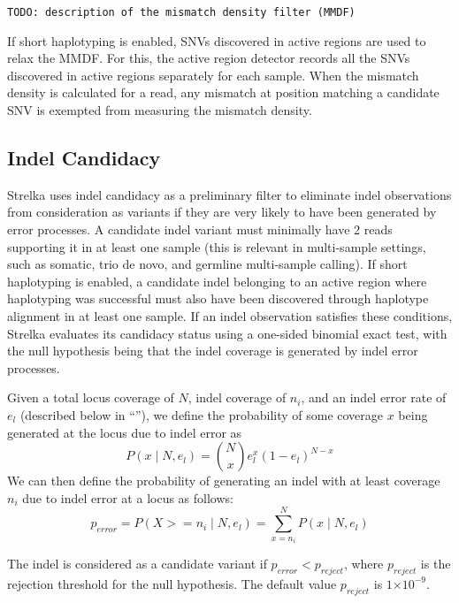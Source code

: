 \documentclass{article}
\newcommand{\e}[1]{\ensuremath{\times 10^{#1}}}
\begin{document}
{\tt TODO: description of the mismatch density filter (MMDF)}

If short haplotyping is enabled, SNVs discovered in active regions are used to relax the MMDF. For this, the active region detector records all the SNVs discovered in active regions separately for each sample. When the mismatch density is calculated for a read, any mismatch at position matching a candidate SNV is exempted from measuring the mismatch density.


\subsection{Indel Candidacy}
\label{sec:IndelCandidacy}

Strelka uses indel candidacy as a preliminary filter to eliminate indel observations from consideration as variants if they are very likely to have been generated by error processes.  A candidate indel variant must minimally have 2 reads supporting it in at least one sample (this is relevant in multi-sample settings, such as somatic, trio de novo, and germline multi-sample calling). If short haplotyping is enabled, a candidate indel belonging to an active region where haplotyping was successful must also have been discovered through haplotype alignment in at least one sample. If an indel observation satisfies these conditions, Strelka evaluates its candidacy status using a one-sided binomial exact test, with the null hypothesis being that the indel coverage is generated by indel error processes.

Given a total locus coverage of $N$, indel coverage of $n_i$, and an indel error rate of $e_l$ (described below in ``''), we define the probability of some coverage $x$ being generated at the locus due to indel error as
\begin{equation*}
P(x \mid N, e_l) = \binom {N} {x} e^{x}_l (1 - e_l)^{N - x}
\end{equation*}
We can then define the probability of generating an indel with at least coverage $n_i$ due to indel error at a locus as follows:
\begin{equation*}
p_{error} = P(X >= n_i \mid N, e_l) = \sum_{x = n_i}^{N} P(x \mid N, e_l)
\end{equation*}

\noindent The indel is considered as a candidate variant if $p_{error} < p_{reject}$, where $p_{reject}$ is the rejection threshold for the null hypothesis. The default value $p_{reject}$ is $1\e{-9}$.
\end{document}
